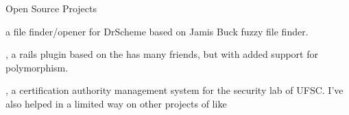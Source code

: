 \begin{rubric}{Open Source Projects} 



\entry* 
    \textbf{} a
    file finder/opener for DrScheme based on Jamis Buck fuzzy file finder.


\entry* 
    \textbf{}, a rails
    plugin based on the has many friends, but with added support for
    polymorphism.

\entry* 
    \textbf{}, a
    certification authority management system for the security lab of UFSC. I've
    also helped in a limited way on other projects of
    like 

\end{rubric}
